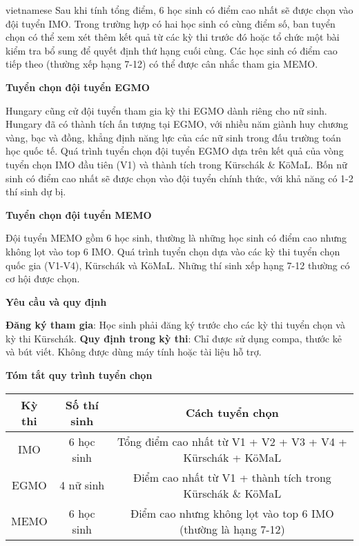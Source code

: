 \documentclass{article}
\begin{document}
\begin{otherlanguage*}{vietnamese}
Sau khi tính tổng điểm, 6 học sinh có điểm cao nhất sẽ được chọn vào đội tuyển IMO.
Trong trường hợp có hai học sinh có cùng điểm số, ban tuyển chọn có thể xem xét thêm kết quả từ các kỳ thi trước đó hoặc tổ chức một bài kiểm tra bổ sung để quyết định thứ hạng cuối cùng.
Các học sinh có điểm cao tiếp theo (thường xếp hạng 7-12) có thể được cân nhắc tham gia MEMO.

\textbf{Tuyển chọn đội tuyển EGMO}

Hungary cũng cử đội tuyển tham gia kỳ thi EGMO dành riêng cho nữ sinh.
Hungary đã có thành tích ấn tượng tại EGMO, với nhiều năm giành huy chương vàng, bạc và đồng, khẳng định năng lực của các nữ sinh trong đấu trường toán học quốc tế.
Quá trình tuyển chọn đội tuyển EGMO dựa trên kết quả của vòng tuyển chọn IMO đầu tiên (V1) và thành tích trong Kürschák \& KöMaL.
Bốn nữ sinh có điểm cao nhất sẽ được chọn vào đội tuyển chính thức, với khả năng có 1-2 thí sinh dự bị.

\textbf{Tuyển chọn đội tuyển MEMO}

Đội tuyển MEMO gồm 6 học sinh, thường là những học sinh có điểm cao nhưng không lọt vào top 6 IMO. Quá trình tuyển chọn dựa vào các kỳ thi tuyển chọn quốc gia (V1-V4), Kürschák và KöMaL.
Những thí sinh xếp hạng 7-12 thường có cơ hội được chọn.

\textbf{Yêu cầu và quy định}

\begin{itemize}[topsep=0pt, partopsep=0pt, itemsep=0pt]
    \ii \textbf{Đăng ký tham gia}: Học sinh phải đăng ký trước cho các kỳ thi tuyển chọn và kỳ thi Kürschák.
    \ii \textbf{Quy định trong kỳ thi}: Chỉ được sử dụng compa, thước kẻ và bút viết. Không được dùng máy tính hoặc tài liệu hỗ trợ.
\end{itemize}

\textbf{Tóm tắt quy trình tuyển chọn}
\begin{center}
    \begin{tabular}{|c|c|c|}
        \hline
        \textbf{Kỳ thi} & \textbf{Số thí sinh} & \textbf{Cách tuyển chọn} \\
        \hline
        IMO & 6 học sinh & Tổng điểm cao nhất từ V1 + V2 + V3 + V4 + Kürschák + KöMaL \\
        \hline
        EGMO & 4 nữ sinh & Điểm cao nhất từ V1 + thành tích trong Kürschák \& KöMaL \\
        \hline
        MEMO & 6 học sinh & Điểm cao nhưng không lọt vào top 6 IMO (thường là hạng 7-12) \\
        \hline
    \end{tabular} 
\end{center}


\end{otherlanguage*}
\end{document}
